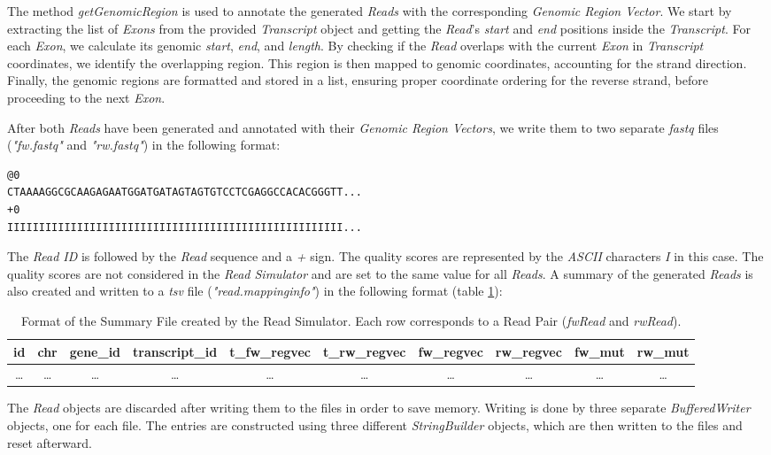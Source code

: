 \documentclass[12pt]{article}
\begin{document}
\begin{enumerate}
		The method \textit{getGenomicRegion} is used to annotate the generated \textit{Reads} with the corresponding \textit{Genomic Region Vector}.
		We start by extracting the list of \textit{Exons} from the provided \textit{Transcript} object and getting the
		\textit{Read}’s \textit{start} and \textit{end} positions inside the \textit{Transcript}. For each \textit{Exon}, we calculate its genomic \textit{start}, \textit{end}, and \textit{length}.
		By checking if the \textit{Read} overlaps with the current \textit{Exon} in \textit{Transcript} coordinates, we identify the overlapping region.
		This region is then mapped to genomic coordinates, accounting for the strand direction.
		Finally, the genomic regions are formatted and stored in a list, ensuring proper coordinate ordering for the reverse strand,
		before proceeding to the next \textit{Exon}.

		After both \textit{Reads} have been generated and annotated with their \textit{Genomic Region Vectors}, we write them to two separate \textit{fastq} files
		(\textit{"fw.fastq"} and \textit{"rw.fastq"}) in the following format:
		\begin{verbatim}
@0
CTAAAAGGCGCAAGAGAATGGATGATAGTAGTGTCCTCGAGGCCACACGGGTT...
+0
IIIIIIIIIIIIIIIIIIIIIIIIIIIIIIIIIIIIIIIIIIIIIIIIIIIII...
        \end{verbatim}\label{fastq}
		The \textit{Read ID} is followed by the \textit{Read} sequence and a \textit{+} sign. The quality scores are represented by the \textit{ASCII} characters
		\textit{I} in this case. The quality scores are not considered in the \textit{Read Simulator} and are set to the same value for all \textit{Reads}.
		A summary of the generated \textit{Reads} is also created and written to a \textit{tsv} file (\textit{"read.mappinginfo"}) in the following format (table \ref{tab:summary-format}):


		\setlength{\tabcolsep}{3pt}
		\begin{table}[htpb]
			\centering
			\caption{Format of the Summary File created by the Read Simulator. Each row corresponds to a Read Pair (\textit{fwRead} and \textit{rwRead}).}
			\label{tab:summary-format}
			\small
			\begin{tabular}{|c|c|c|c|c|c|c|c|c|c|}
				\hline
				id    & chr   & gene\_id & transcript\_id & t\_fw\_regvec & t\_rw\_regvec & fw\_regvec & rw\_regvec & fw\_mut & rw\_mut \\ \hline
				\dots & \dots & \dots    & \dots          & \dots         & \dots         & \dots      & \dots      & \dots   & \dots   \\
				\hline
			\end{tabular}
		\end{table}

		The \textit{Read} objects are discarded after writing them to the files in order to save memory.
		Writing is done by three separate \textit{BufferedWriter} objects, one for each file.
		The entries are constructed using three different \textit{StringBuilder} objects, which are then written to the files and reset afterward.

\end{enumerate}
\newpage
\end{document}

